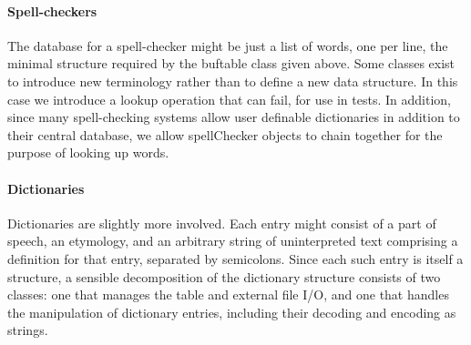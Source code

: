 
\paragraph{Spell-checkers}
The database for a spell-checker might be just a list of words, one per
line, the minimal structure required by the \textsf{buftable} class
given above. Some classes exist to introduce new terminology rather
than to define a new data structure. In this case we introduce a lookup
operation that can fail, for use in tests. In addition, since many
spell-checking systems allow user definable dictionaries in addition to
their central database, we allow \textsf{spellChecker} objects to chain
together for the purpose of looking up words. 


\paragraph{Dictionaries}
Dictionaries are slightly more involved. Each entry might consist of a
part of speech, an etymology, and an arbitrary string of uninterpreted
text comprising a definition for that entry, separated by semicolons.
Since each such entry is itself a structure, a sensible decomposition
of the dictionary structure consists of two classes: one that manages
the table and external file I/O, and one that handles the manipulation
of dictionary entries, including their decoding and encoding as
strings. 


